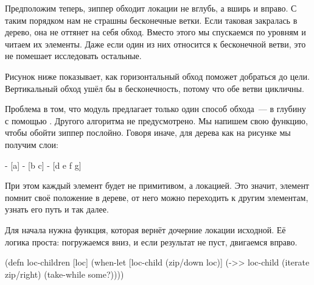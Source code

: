 \begin{figure}[H]
  \centering
  
  \label{fig:chart-zip-20}
\end{figure}

Предположим теперь, зиппер обходит локации не вглубь, а вширь и вправо. С таким
порядком нам не страшны бесконечные ветки. Если таковая закралась в дерево, она
не оттянет на себя обход. Вместо этого мы спускаемся по уровням и читаем их
элементы. Даже если один из них относится к бесконечной ветви, это не помешает
исследовать остальные.

Рисунок ниже показывает, как горизонтальный обход поможет добраться до
цели. Вертикальный обход ушёл бы в бесконечность, потому что обе ветви
цикличны.

\begin{figure}[H]
  \centering
  
  \label{fig:chart-zip-21}
\end{figure}


Проблема в том, что модуль  предлагает только один способ
обхода~--- в глубину с помощью . Другого алгоритма не
предусмотрено. Мы напишем свою функцию, чтобы обойти зиппер послойно. Говоря
иначе, для дерева как на рисунке мы получим слои:

\begin{figure}[H]
  \centering
  
  \label{fig:chart-zip-22}
\end{figure}


\begin{english}
  \begin{text}
- [a]
- [b c]
- [d e f g]
  \end{text}
\end{english}

При этом каждый элемент будет не примитивом, а локацией. Это значит, элемент
помнит своё положение в дереве, от него можно переходить к другим элементам,
узнать его путь и так далее.

Для начала нужна функция, которая вернёт дочерние локации исходной. Её логика
проста: погружаемся вниз, и если результат не пуст, двигаемся вправо.

\begin{english}
  \begin{clojure}
(defn loc-children [loc]
  (when-let [loc-child (zip/down loc)]
    (->> loc-child
         (iterate zip/right)
         (take-while some?))))
  \end{clojure}
\end{english}

